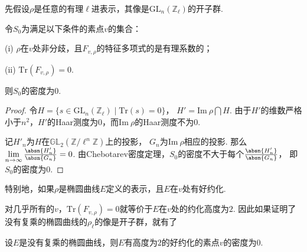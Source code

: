 
先假设$\rho$是任意的有理$\ell$进表示，其像是$\mathrm{GL}_n(\mathbb{Z}_{\ell})$的开子群.

\begin{cprop}
    令$S_0$为满足以下条件的素点$v$的集合：

    (i) $\rho$在$v$处非分歧，且$F_{v,\rho}$的特征多项式的是有理系数的；

    (ii) $\mathrm{Tr}(F_{v,\rho}) = 0$.

    则$S_0$的密度为$0$.
\end{cprop}

\begin{proof}
    令$H = \{s\in \mathrm{GL}_n(\mathbb{Z}_{\ell})\mid \mathrm{Tr}(s)=0\}$，
    $H' = \mathrm{Im}\ \rho \bigcap H$.
    由于$H'$的维数严格小于$n^2$，$H'$的Haar测度为$0$，而$\mathrm{Im}\ \rho$的Haar测度不为$0$.

    记$H'_n$为$H$在$\mathbb{GL}_2(\mathbb{Z}/\ell^n \mathbb{Z})$上的投影，
    $G_n$为$\mathrm{Im}\ \rho$相应的投影. 那么$\lim\limits_{n\to \infty} \frac{\absn{H'_n}}{\absn{G_n}} = 0$.
    由Chebotarev密度定理，$S_0$的密度不大于每个$\frac{\absn{H'_n}}{\absn{G_n}}$，
    即$S_0$的密度为$0$.
\end{proof}

特别地，如果$\rho$是椭圆曲线$E$定义的表示，且$E$在$v$处有好约化.

对几乎所有的$v$，$\mathrm{Tr}(F_{v,\rho})=0$就等价于$E$在$v$处的约化高度为$2$.
因此如果证明了没有复乘的椭圆曲线的$\rho_{\ell}$的像是开子群，就有了
\begin{ccor}
    设$E$是没有复乘的椭圆曲线，则$E$有高度为$2$的好约化的素点$v$的密度为$0$.\label{height2::sparse}
\end{ccor}
